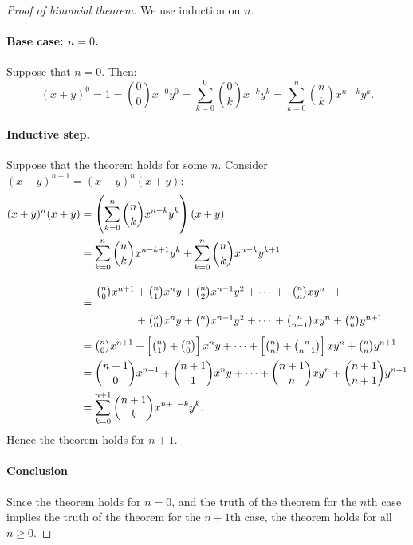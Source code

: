 \documentclass[a4paper, 10pt]{amsart}
\theoremstyle{definition}
\theoremstyle{remark}
\begin{document}
\begin{proof}[Proof of binomial theorem]
  We use induction on $ n $.

  \paragraph{Base case: $ n = 0 $.}
  Suppose that $ n = 0 $. Then:
  \begin{displaymath}
    (x + y)^0 = 1 = \binom{0}{0} x^{-0} y^0 = \sum_{k = 0}^0 \binom{0}{k} x^{-k} y^k = \sum_{k = 0}^n \binom{n}{k} x^{n - k} y^k.
  \end{displaymath}

  \paragraph{Inductive step.}
  Suppose that the theorem holds for some $ n $. Consider $ (x + y)^{n + 1} = (x + y)^n (x + y) $:
  \begin{align*}
    (x + y)^n (x + y) &= \left(\sum_{k = 0}^n \binom{n}{k} x^{n - k} y^k\right)(x + y)\\
                      &= \sum_{k = 0}^n \binom{n}{k} x^{n - k + 1} y^k + \sum_{k = 0}^n \binom{n}{k} x^{n - k} y^{k + 1}\\
                      &= \arraycolsep=1.2pt\def\arraystretch{2.2}\begin{array}{ccccccccccc}
                           \binom{n}{0} x^{n + 1} &+& \binom{n}{1} x^n y &+& \binom{n}{2} x^{n - 1} y^2 &+& \cdots &+& \binom{n}{n} x y^n &+&\\
                                                  &+& \binom{n}{0} x^n y &+& \binom{n}{1} x^{n - 1} y^2 &+& \cdots &+& \binom{n}{n - 1} x y^n &+& \binom{n}{n} y^{n + 1}
                         \end{array}\\
                      &= \tbinom{n}{0} x^{n + 1} + \left[\tbinom{n}{1} + \tbinom{n}{0}\right] x^n y + \cdots
                            + \left[\tbinom{n}{n} + \tbinom{n}{n - 1}\right] x y^n + \tbinom{n}{n} y^{n + 1}\\
                      &= \binom{n + 1}{0} x^{n + 1} + \binom{n + 1}{1} x^n y + \cdots + \binom{n + 1}{n} x y^n + \binom{n + 1}{n + 1} y^{n + 1}\\
                      &= \sum_{k = 0}^{n + 1} \binom{n + 1}{k} x^{n + 1 - k} y^k.
  \end{align*}
  Hence the theorem holds for $ n + 1 $.

  \paragraph{Conclusion}
  Since the theorem holds for $ n = 0 $, and the truth of the theorem for the $ n$th case implies the truth of the theorem for the $ n + 1$th case,
  the theorem holds for all $ n \geq 0 $.
\end{proof}
\end{document}
